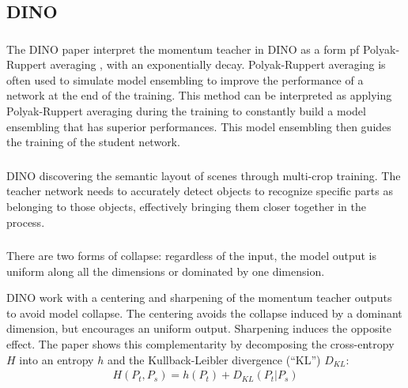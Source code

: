 \documentclass{article}
\begin{document}
\subsection{DINO}
\subsubsection{}
The DINO paper interpret the momentum teacher in DINO as a form pf Polyak-Ruppert averaging
, with an exponentially decay. Polyak-Ruppert averaging is often used
to simulate model ensembling to improve the performance
of a network at the end of the training. This method can
be interpreted as applying Polyak-Ruppert averaging during
the training to constantly build a model ensembling that has
superior performances. This model ensembling then guides
the training of the student network.



\subsubsection{}
DINO discovering the semantic layout of scenes through multi-crop training.
The teacher network needs to accurately detect objects to recognize specific 
parts as belonging to those objects, effectively bringing them closer together 
in the process.

\subsubsection{}
There are two forms of collapse: regardless of the input, the model output is uniform
along all the dimensions or dominated by one dimension.

DINO work with a centering and sharpening of
the momentum teacher outputs to avoid model collapse. 
The centering avoids the collapse induced by a dominant
dimension, but encourages an uniform output. Sharpening
induces the opposite effect. The paper shows this complementarity
by decomposing the cross-entropy $H$ into an entropy $h$ and
the Kullback-Leibler divergence (“KL”) $D_{KL}$:
\begin{align*}
    H(P_t, P_s) = h(P_t) + D_{KL}(P_t | P_s)
\end{align*}
\end{document}
